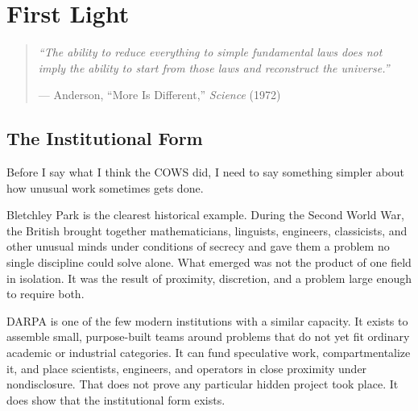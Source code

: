 
\chapter{First Light}
\label{record:first-light}
\label{record:demonstration}  %

\begin{quote}\small\textit{%
``The ability to reduce everything to simple fundamental laws does not imply the ability to start from those laws and reconstruct the universe.''%
}\par\raggedleft --- Anderson, ``More Is Different,'' \textit{Science} (1972)\end{quote}

\vspace{0.5cm}


\section*{The Institutional Form}
\label{record:fl-institutional-form}

Before I say what I think the COWS did, I need to say something simpler
about how unusual work sometimes gets done.

Bletchley Park is the clearest historical example. During the Second World
War, the British brought together mathematicians, linguists, engineers,
classicists, and other unusual minds under conditions of secrecy and gave
them a problem no single discipline could solve alone. What emerged was
not the product of one field in isolation. It was the result of proximity,
discretion, and a problem large enough to require both.

DARPA is one of the few modern institutions with a similar capacity. It
exists to assemble small, purpose-built teams around problems that do not
yet fit ordinary academic or industrial categories. It can fund speculative
work, compartmentalize it, and place scientists, engineers, and operators
in close proximity under nondisclosure. That does not prove any particular
hidden project took place. It does show that the institutional form exists.

